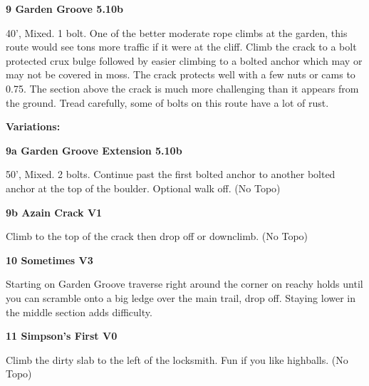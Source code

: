 \begin{multicols}{2}
\needspace{1.5cm}
\label{rt:Garden Groove}
\colorbox{RoyalBlue!20}{
\parbox{0.95\linewidth}{
\textbf{
9 Garden Groove 5.10b  
}}}

\begin{adjustwidth}{0.5cm}{}			
40', Mixed. 1 bolt. One of the better moderate rope climbs at the garden, this route would see tons more traffic if it were at the cliff. Climb the crack to a bolt protected crux bulge followed by easier climbing to a bolted anchor which may or may not be covered in moss. The crack protects well with a few nuts or cams to 0.75. The section above the crack is much more challenging than it appears from the ground. Tread carefully, some of bolts on this route have a lot of rust.
\end{adjustwidth}

\begin{adjustwidth}{0.5cm}{}				
\needspace{3cm}
\textbf{Variations:} \newline

\needspace{1.5cm}
\label{vr:Garden Groove Extension}
\colorbox{RoyalBlue!20}{
\parbox{0.95\linewidth}{
\textbf{
9a Garden Groove Extension 5.10b  
}}}

\begin{adjustwidth}{0.5cm}{}			
50', Mixed. 2 bolts. Continue past the first bolted anchor to another bolted anchor at the top of the boulder. Optional walk off. (No Topo)
\end{adjustwidth}



\needspace{1.5cm}
\label{vr:Azain Crack}
\colorbox{green!20}{
\parbox{0.95\linewidth}{
\textbf{
9b Azain Crack V1  
}}}

\begin{adjustwidth}{0.5cm}{}			
Climb to the top of the crack then drop off or downclimb. (No Topo)
\end{adjustwidth}


\end{adjustwidth}


\needspace{1.5cm}
\label{rt:Sometimes}
\colorbox{green!20}{
\parbox{0.95\linewidth}{
\textbf{
10 Sometimes V3  
}}}

\begin{adjustwidth}{0.5cm}{}			
Starting on Garden Groove traverse right around the corner on reachy holds until you can scramble onto a big ledge over the main trail, drop off. Staying lower in the middle section adds difficulty.
\end{adjustwidth}



\needspace{1.5cm}
\label{rt:Simpson's First}
\colorbox{green!20}{
\parbox{0.95\linewidth}{
\textbf{
11 Simpson's First V0  
}}}

\begin{adjustwidth}{0.5cm}{}			
Climb the dirty slab to the left of the locksmith. Fun if you like highballs. (No Topo)
\end{adjustwidth}




\newpage
	\end{multicols}
